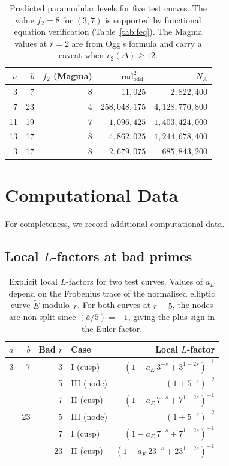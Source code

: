 \documentclass[11pt,a4paper]{article}
\newcommand{\rad}{\operatorname{rad}}
\theoremstyle{definition}
\theoremstyle{remark}
\begin{document}
\begin{table}[H]
\centering
\begin{tabular}{rrrrr}
\toprule
$a$ & $b$ & $f_2$ (Magma) & $\rad_{\mathrm{odd}}^2$ & $N_A$ \\
\midrule
3 & 7  & 8 & $11{,}025$ & $2{,}822{,}400$ \\
7 & 23 & 4 & $258{,}048{,}175$ & $4{,}128{,}770{,}800$ \\
11 & 19 & 7 & $1{,}096{,}425$ & $1{,}403{,}424{,}000$ \\
13 & 17 & 8 & $4{,}862{,}025$ & $1{,}244{,}678{,}400$ \\
3 & 17 & 8 & $2{,}679{,}075$ & $685{,}843{,}200$ \\
\bottomrule
\end{tabular}
\caption{Predicted paramodular levels for five test curves.
  The value $f_2 = 8$ for $(3,7)$ is supported by functional
  equation verification (Table~\ref{tab:feq}).
  The Magma values at $r = 2$ are from Ogg's formula and carry
  a caveat when $v_2(\Delta) \ge 12$.}
\label{tab:levels}
\end{table}


\section{Computational Data}\label{sec:data}

For completeness, we record additional computational data.

\subsection{Local $L$-factors at bad primes}

\begin{table}[H]
\centering
\begin{tabular}{rrrlr}
\toprule
$a$ & $b$ & Bad $r$ & Case & Local $L$-factor \\
\midrule
3 & 7 & 3 & I (cusp) & $(1 - a_E\, 3^{-s} + 3^{1-2s})^{-1}$ \\
  &   & 5 & III (node) & $(1 + 5^{-s})^{-2}$ \\
  &   & 7 & II (cusp) & $(1 - a_E\, 7^{-s} + 7^{1-2s})^{-1}$ \\
\addlinespace
7 & 23 & 5 & III (node) & $(1 + 5^{-s})^{-2}$ \\
  &   & 7 & I (cusp) & $(1 - a_E\, 7^{-s} + 7^{1-2s})^{-1}$ \\
  &   & 23 & II (cusp) & $(1 - a_E\, 23^{-s} + 23^{1-2s})^{-1}$ \\
\bottomrule
\end{tabular}
\caption{Explicit local $L$-factors for two test curves.
  Values of $a_E$ depend on the Frobenius trace of the
  normalised elliptic curve $\tilde{E}$ modulo~$r$.
  For both curves at $r=5$, the nodes are non-split since
  $(\bar{a}/5) = -1$, giving the plus sign in the Euler factor.}
\label{tab:localdata}
\end{table}
\end{document}
